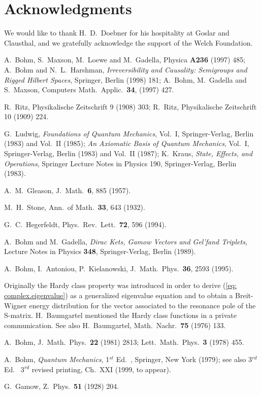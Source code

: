 \documentclass[12pt]{article}
\begin{document}
\section*{Acknowledgments}

We would like to thank H.~D.~Doebner for his hospitality at Goslar and Clausthal, and we gratefully acknowledge the support of the Welch Foundation.

\begin{thebibliography}{99}

 A.~Bohm, S.~Maxson, M.~Loewe and M.~Gadella, Physica {\bf A236} (1997) 485; A.~Bohm and N.~L.~Harshman, {\it Irreversibility and Causality: Semigroups and Rigged Hilbert Spaces}, Springer, Berlin (1998) 181; A.~Bohm, M.~Gadella and S.~Maxson, Computers Math.~Applic.~{\bf 34}, (1997) 427.

 R.~Ritz, Physikalische Zeitschrift 9 (1908) 303; R.~Ritz, Physikalische Zeitschrift 10 (1909) 224.

 G.~Ludwig, {\it Foundations of Quantum Mechanics}, Vol.~I, Springer-Verlag, Berlin (1983) and Vol.~II (1985); {\it An Axiomatic Basis of Quantum Mechanics}, Vol.~I, Springer-Verlag, Berlin (1983) and Vol.~II (1987); K.~Kraus, {\it State, Effects, and Operations}, Springer Lecture Notes in Physics 190, Springer-Verlag, Berlin (1983).

 A.~M.~Gleason, J.~Math.~{\bf 6}, 885 (1957).

 M.~H.~Stone, Ann.~of Math.~{\bf 33}, 643 (1932).

 G.~C.~Hegerfeldt, Phys.~Rev.~Lett.~{\bf 72}, 596 (1994).

 A.~Bohm and M.~Gadella, {\it Dirac Kets, Gamow Vectors and Gel'fand Triplets}, Lecture Notes in Physics {\bf 348}, Springer-Verlag, Berlin (1989).

 A.~Bohm, I.~Antoniou, P.~Kielanowski, J.~Math.~Phys.~{\bf 36}, 2593 (1995).

 Originally the Hardy class property was introduced in order to derive (\ref{eq: complex.eigenvalue}) as a generalized eigenvalue equation and to obtain a Breit-Wigner energy distribution for the vector associated to the resonance pole of the S-matrix.  H.~Baumgartel mentioned the Hardy class functions in a private communication.  See also H.~Baumgartel, Math.~Nachr.~{\bf 75} (1976) 133.

 A.~Bohm, J.~Math.~Phys.~{\bf 22} (1981) 2813; Lett.~Math.~Phys.~{\bf 3} (1978) 455.

 A.~Bohm, {\it Quantum Mechanics}, 1$^{st}$ Ed.~, Springer, New York (1979); see also 3$^{rd}$ Ed.~ 3$^{rd}$ revised printing, Ch.~XXI (1999, to appear).

 G.~Gamow, Z.~Phys.~{\bf 51} (1928) 204.

\end{thebibliography}
\end{document}
